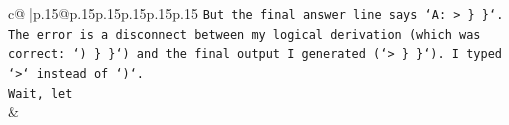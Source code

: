 \documentclass{article}
\begin{document}
{\begin{supertabular}{c@{$\;$}|p{.15\linewidth}@{}p{.15\linewidth}p{.15\linewidth}p{.15\linewidth}p{.15\linewidth}p{.15\linewidth}}
{{{\texttt{But the final answer line says `A: > \} \}`.} \\
\texttt{The error is a disconnect between my logical derivation (which was correct: `) \} \}`) and the final output I generated (`> \} \}`). I typed `>` instead of `)`.} \\
\texttt{Wait, let} \\
            }
        }
    }
    & \\ \\

\end{supertabular}
}
\end{document}
